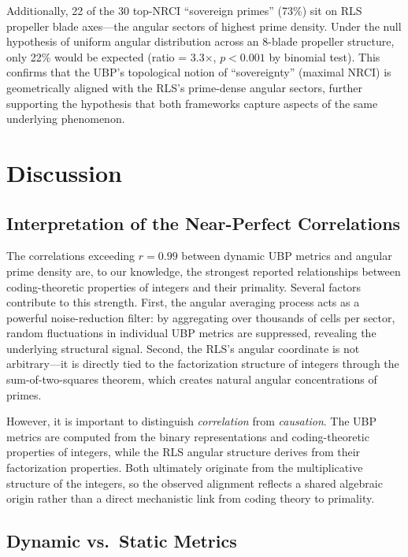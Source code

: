 \documentclass[11pt,a4paper]{article}
\theoremstyle{definition}
\begin{document}
Additionally, 22 of the 30 top-NRCI ``sovereign primes'' (73\%) sit on RLS propeller blade axes---the angular sectors of highest prime density. Under the null hypothesis of uniform angular distribution across an 8-blade propeller structure, only 22\% would be expected (ratio = 3.3$\times$, $p < 0.001$ by binomial test). This confirms that the UBP's topological notion of ``sovereignty'' (maximal NRCI) is geometrically aligned with the RLS's prime-dense angular sectors, further supporting the hypothesis that both frameworks capture aspects of the same underlying phenomenon.

\section{Discussion}\label{sec:discussion}

\subsection{Interpretation of the Near-Perfect Correlations}

The correlations exceeding $r = 0.99$ between dynamic UBP metrics and angular prime density are, to our knowledge, the strongest reported relationships between coding-theoretic properties of integers and their primality. Several factors contribute to this strength. First, the angular averaging process acts as a powerful noise-reduction filter: by aggregating over thousands of cells per sector, random fluctuations in individual UBP metrics are suppressed, revealing the underlying structural signal. Second, the RLS's angular coordinate is not arbitrary---it is directly tied to the factorization structure of integers through the sum-of-two-squares theorem, which creates natural angular concentrations of primes.

However, it is important to distinguish \emph{correlation} from \emph{causation}. The UBP metrics are computed from the binary representations and coding-theoretic properties of integers, while the RLS angular structure derives from their factorization properties. Both ultimately originate from the multiplicative structure of the integers, so the observed alignment reflects a shared algebraic origin rather than a direct mechanistic link from coding theory to primality.

\subsection{Dynamic vs.\ Static Metrics}
\end{document}
